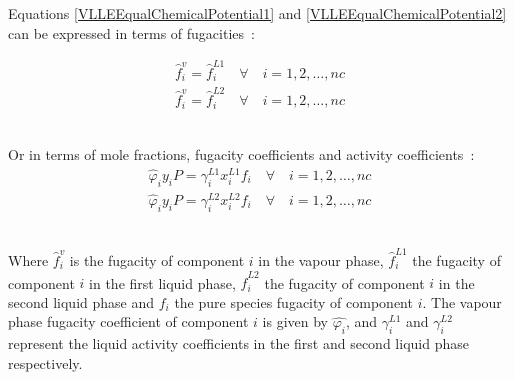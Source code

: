 Equations \ref{VLLEEqualChemicalPotential1} and \ref{VLLEEqualChemicalPotential2} can be expressed in terms of fugacities~\cite{PhaseEquilCalcsESandGEM, ComputerCalculationsVLEandLLE}:\

\begin{eqnarray}
\hat{f}_{i}^{v} = \hat{f}_{i}^{L1} \quad \forall \quad i = 1, 2,\ldots, nc\label{VLLEEqualFugacity1}\\
\hat{f}_{i}^{v} = \hat{f}_{i}^{L2} \quad \forall \quad i = 1, 2,\ldots, nc\label{VLLEEqualFugacity2}
\end{eqnarray}\

Or in terms of mole fractions, fugacity coefficients and activity coefficients~\cite{PhaseEquilCalcsESandGEM, ComputerCalculationsVLEandLLE}:\
\begin{eqnarray}
\hat{\varphi}_{i}y_{i}P = \gamma^{L1}_{i}x_{i}^{L1}f_{i} \quad \forall \quad i = 1, 2,\ldots, nc \label{VLLEEqualFugacity1Coefficient}\\
\hat{\varphi}_{i}y_{i}P = \gamma^{L2}_{i}x_{i}^{L2}f_{i} \quad \forall \quad i = 1, 2,\ldots, nc \label{VLLEEqualFugacity2Coefficient}
\end{eqnarray}\

Where $\hat{f}_{i}^{v}$ is the fugacity of component $i$ in the vapour phase, $\hat{f}_{i}^{L1}$ the fugacity of component $i$ in the first liquid phase, $\hat{f}_{i}^{L2}$ the fugacity of component $i$ in the second liquid phase and $f_{i}$ the pure species fugacity of component $i$. The vapour phase fugacity coefficient of component $i$ is given by $\hat{\varphi_{i}}$, and $\gamma^{L1}_{i}$ and $\gamma^{L2}_{i}$ represent the liquid activity coefficients in the first and second liquid phase respectively.\\

